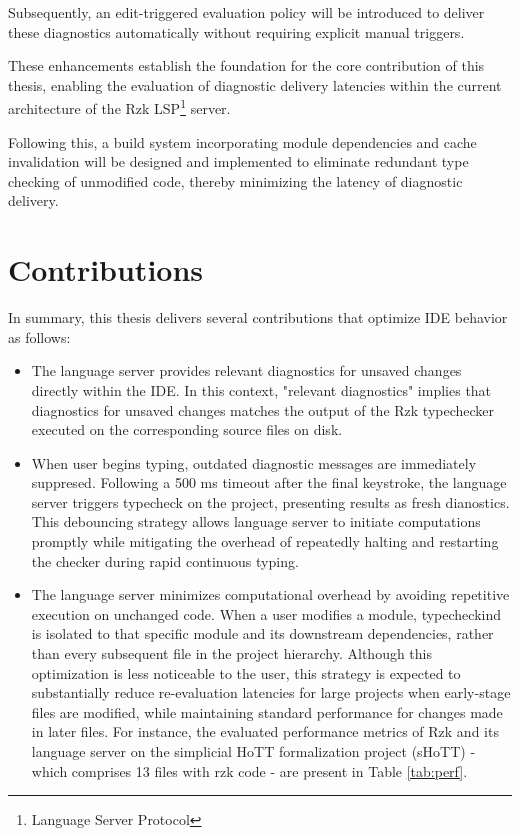 Subsequently, an edit-triggered evaluation policy will be introduced
to deliver these diagnostics automatically without requiring explicit manual triggers.

These enhancements establish the foundation for the core contribution of this thesis,
enabling the evaluation of diagnostic delivery latencies
within the current architecture of the Rzk LSP\footnote{Language Server Protocol} server.

Following this, a build system incorporating module dependencies and cache invalidation
will be designed and implemented to eliminate redundant type checking of unmodified code,
thereby minimizing the latency of diagnostic delivery.


\section{Contributions}
\label{intro:contr}

In summary, this thesis delivers several contributions that optimize IDE behavior as follows:
\begin{itemize}
	\item The language server provides relevant diagnostics for unsaved changes directly within the IDE.
	In this context, "relevant diagnostics" implies that diagnostics for unsaved changes matches
	the output of the Rzk typechecker executed on the corresponding source files on disk.
	\item When user begins typing, outdated diagnostic messages are immediately suppresed.
	Following a 500 ms timeout after the final keystroke, the language server triggers typecheck on the project,
	presenting results as fresh dianostics.
	This debouncing strategy allows language server to initiate computations promptly
	while mitigating the overhead of repeatedly halting and restarting the checker during rapid continuous typing.
	\item The language server minimizes computational overhead by avoiding repetitive execution on unchanged code.
	When a user modifies a module, typecheckind is isolated to that specific module and
	its downstream dependencies, rather than every subsequent file in the project hierarchy.
	Although this optimization is less noticeable to the user, this strategy is expected
	to substantially reduce re-evaluation latencies for large projects when early-stage files are modified,
	while maintaining standard performance for changes made in later files.
	For instance, the evaluated performance metrics of Rzk and its language server on
	the simplicial HoTT formalization project (sHoTT)\cite{shott} -
	which comprises 13 files with rzk code - are present in Table \ref{tab:perf}.
\end{itemize}


